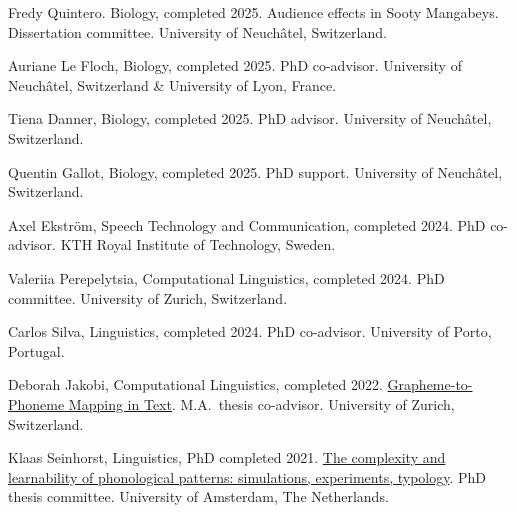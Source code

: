 \documentclass[11pt]{article}
\newcommand{\hangpara}{
 \setlength{\parindent}{0in} %
 \hangindent=0.42in %
}
\begin{document}
\hangpara
Fredy Quintero. Biology, completed 2025. Audience effects in Sooty Mangabeys. Dissertation committee. University of Neuchâtel, Switzerland.

\hangpara
\vskip 6pt
Auriane Le Floch, Biology, completed 2025. PhD co-advisor. University of Neuchâtel, Switzerland \& University of Lyon, France.

\hangpara
\vskip 6pt
Tiena Danner, Biology, completed 2025. PhD advisor. University of Neuchâtel, Switzerland.


\hangpara
\vskip 6pt
Quentin Gallot, Biology, completed 2025. PhD support. University of Neuchâtel, Switzerland.

\hangpara
\vskip 6pt
Axel Ekström, Speech Technology and Communication, completed 2024. PhD co-advisor. KTH Royal Institute of Technology, Sweden.

\hangpara
\vskip 6pt
Valeriia Perepelytsia, Computational Linguistics, completed 2024. PhD committee. University of Zurich, Switzerland.

\hangpara
\vskip 6pt
Carlos Silva, Linguistics, completed 2024. PhD co-advisor. University of Porto, Portugal.

\hangpara
\vskip 6pt
Deborah Jakobi, Computational Linguistics, completed 2022. \href{https://www.cl.uzh.ch/dam/jcr:f83d8787-3b15-4681-b28f-37706cd4dc0f/MA_Thesis_Jakobi_Deborah_2022.pdf}{Grapheme-to-Phoneme Mapping in Text}. M.A.\ thesis co-advisor. University of Zurich, Switzerland.

\hangpara
\vskip 6pt
Klaas Seinhorst, Linguistics, PhD completed 2021. \href{https://www.fon.hum.uva.nl/klaas/KlaasSeinhorstDissertation.pdf}{The complexity and learnability of phonological patterns: simulations, experiments, typology}. PhD thesis committee. University of Amsterdam, The Netherlands.
\end{document}
